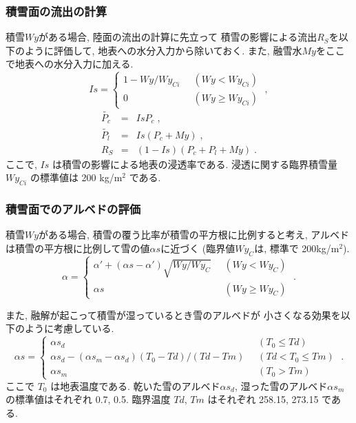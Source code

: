 \subsubsection{積雪面の流出の計算}
 
積雪$Wy$がある場合, 陸面の流出の計算に先立って
積雪の影響による流出$R_S$を以下のように評価して, 
地表への水分入力から除いておく. 
また, 融雪水$My$をここで地表への水分入力に加える. 
\begin{equation}
  Is = \left\{
    \begin{array}{ll}
      1 - Wy / Wy_{Ci} & \;\; ( Wy < Wy_{Ci} ) \\
      0                & \;\; ( Wy \ge Wy_{Ci} )
    \end{array}
  \right. \; ,
\end{equation}
\begin{eqnarray}
  \widetilde{P_c} &=& Is P_c \; ,\\
  \widetilde{P_l} &=& Is ( P_c + My ) \; ,\\
  R_S        &=& ( 1 - Is )( P_c + P_l + My ) \; .
\end{eqnarray}
ここで, $Is$ は積雪の影響による地表の浸透率である. 
浸透に関する臨界積雪量 $Wy_{Ci}$ の標準値は 200 kg/m$^2$ である. 

\subsubsection{積雪面でのアルベドの評価}

積雪$Wy$がある場合, 
積雪の覆う比率が積雪の平方根に比例すると考え,
アルベドは積雪の平方根に比例して雪の値$\alpha s$に近づく
(臨界値$Wy_C$は, 標準で 200kg/m$^2$).
%
\begin{equation}
  \alpha = \left\{ 
  \begin{array}{ll}
    \alpha' + (\alpha s-\alpha')\sqrt{Wy/Wy_{C}} \;\; &  (Wy < Wy_{C}) \\
    \alpha s                                          &  (Wy \ge Wy_{C})
  \end{array}
  \right. \; .
\end{equation}

また, 融解が起こって積雪が湿っているとき雪のアルベドが
小さくなる効果を以下のように考慮している. 
\begin{equation}
  \alpha s = \left\{
    \begin{array}{ll}
      \alpha s_d                        & \;\; (T_0 \le Td) \\
      \alpha s_d - (\alpha s_m -\alpha s_d)
                   (T_0 - Td)/(Td - Tm) & \;\; (Td < T_0 \le Tm) \\
      \alpha s_m                        & \;\; (T_0 > Tm)
    \end{array}
  \right. \; .
\end{equation}
ここで $T_0$ は地表温度である. 
乾いた雪のアルベド$\alpha s_d$, 湿った雪のアルベド$\alpha s_m$
の標準値はそれぞれ 0.7, 0.5. 
臨界温度 $Td$, $Tm$ はそれぞれ 258.15, 273.15 である. 

